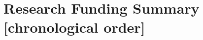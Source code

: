 \documentclass[11pt]{article}
\renewcommand\arraystretch{1}
\begin{document}
\clearpage

\begin{table}[!htbp]
\section*{Research Funding Summary \small{[chronological order]}}
\renewcommand\arraystretch{0.7}
  \centering

\end{table}
\end{document}
